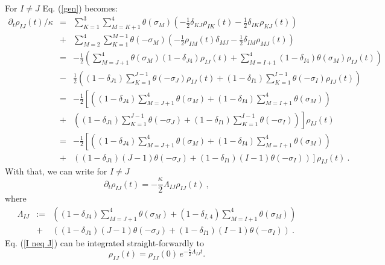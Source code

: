 \documentclass[12pt]{article}
\def\beqn{\begin{eqnarray}}
\def\eeqn{\end{eqnarray}}
\begin{document}
For $I\neq J$ Eq. (\ref{gen}) becomes:
\beqn
\partial_{t}\rho_{IJ}(t)/\kappa &=& \sum_{K=1}^{3}\sum_{M=K+1}^{4}\theta(\sigma_{M})\left(-\frac{1}{2}\delta_{KJ}\rho_{IK}(t)-\frac{1}{2}\delta_{IK}\rho_{KJ}(t)\right) \nonumber \\
&+&\sum_{M=2}^{4}\sum_{K=1}^{M-1}\theta(-\sigma_{M})\left(-\frac{1}{2}\rho_{IM}(t)\delta_{MJ}-\frac{1}{2}\delta_{IM}\rho_{MJ}(t)\right) \nonumber \\
&=&-\frac{1}{2}\left(\sum_{M=J+1}^{4}\theta(\sigma_{M})(1-\delta_{J4})\rho_{IJ}(t)+\sum_{M=I+1}^{4}(1-\delta_{I4})\theta(\sigma_{M})\rho_{IJ}(t)\right)\nonumber \\
&-&\frac{1}{2}\left((1-\delta_{J1})\sum_{K=1}^{J-1}\theta(-\sigma_{J})\rho_{IJ}(t)+(1-\delta_{I1})\sum_{K=1}^{I-1}\theta(-\sigma_{I})\rho_{IJ}(t)\right)\nonumber \\
&=&-\frac{1}{2}\left[\left((1-\delta_{J4})\sum_{M=J+1}^{4}\theta(\sigma_{M})+(1-\delta_{I4})\sum_{M=I+1}^{4}\theta(\sigma_{M})\right) \right. \nonumber \\
&+& \left. \left((1-\delta_{J1})\sum_{K=1}^{J-1}\theta(-\sigma_{J})+(1-\delta_{I1})\sum_{K=1}^{I-1}\theta(-\sigma_{I})\right)\right]\rho_{IJ}(t)\nonumber \\
&=&-\frac{1}{2}\left[\left((1-\delta_{J4})\sum_{M=J+1}^{4}\theta(\sigma_{M})+(1-\delta_{I4})\sum_{M=I+1}^{4}\theta(\sigma_{M})\right) \right. \nonumber \\
&+&\left. \left((1-\delta_{J1})(J-1)\theta(-\sigma_{J})+(1-\delta_{I1})(I-1)\theta(-\sigma_{I})\right)\right]\rho_{IJ}(t)~.
\eeqn
With that, we can write 
for $I\neq J$
\begin{equation}
\partial_{t}\rho_{IJ}(t)=-\frac{\kappa}{2}\Lambda_{IJ}\rho_{IJ}(t)~,\label{I neq J}
\end{equation}
where
\beqn
\Lambda_{IJ} &:=&\left((1-\delta_{J4})\sum_{M=J+1}^{4}\theta(\sigma_{M})+(1-\delta_{I,4})\sum_{M=I+1}^{4}\theta(\sigma_{M})\right) \nonumber \\
&+&\left((1-\delta_{J1})(J-1)\theta(-\sigma_{J})+(1-\delta_{I1})(I-1)\theta(-\sigma_{I})\right)~.
\eeqn
Eq. (\ref{I neq J}) can be integrated straight-forwardly to
\begin{equation}
\rho_{IJ}(t)=\rho_{IJ}(0)\,e^{-\frac{\kappa}{2}\Lambda_{IJ}t}.\label{Sol I neq J}
\end{equation}
\end{document}

